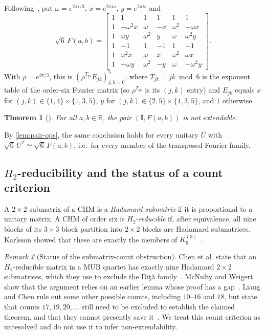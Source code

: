\documentclass[11pt]{article}
\numberwithin{equation}{section}
\theoremstyle{plain}
\newtheorem{theorem}{Theorem}[section]
\theoremstyle{definition}
\theoremstyle{remark}
\newtheorem{remark}[theorem]{Remark}
\newcommand{\I}{\mathbf{I}}
\newcommand{\Dita}{\texorpdfstring{Di\c{t}\u{a}}{Dita}}
\begin{document}
Following~\cite[Eq.~(3)]{Jaming2009}, put $\omega=e^{2\pi i/3}$, $x=e^{2\pi ia}$, $y=e^{2\pi ib}$ and
\begin{equation}\label{eq:jaming}
\sqrt6\,F(a,b)=
\begin{bmatrix}
1&1&1&1&1&1\\
1&-\omega^2x&\omega&-x&\omega^2&-\omega x\\
1&\omega y&\omega^2&y&\omega&\omega^2y\\
1&-1&1&-1&1&-1\\
1&\omega^2x&\omega&x&\omega^2&\omega x\\
1&-\omega y&\omega^2&-y&\omega&-\omega^2y
\end{bmatrix}.
\end{equation}
With $\rho=e^{i\pi/3}$, this is $(\rho^{T_{jk}}E_{jk})_{j,k=0}^5$, where $T_{jk}=jk\bmod 6$ is the exponent table of the order-six Fourier matrix (so $\rho^{T_{jk}}$ is its $(j,k)$ entry) and $E_{jk}$ equals $x$ for $(j,k)\in\{1,4\}\times\{1,3,5\}$, $y$ for $(j,k)\in\{2,5\}\times\{1,3,5\}$, and $1$ otherwise.

\begin{theorem}[{\cite[Thm.~1.4]{Jaming2009}}]\label{thm:jaming}
For all $a,b\in\mathbb R$, the pair $(\I,F(a,b))$ is not extendable.
\end{theorem}

By \cref{lem:pair-ops}, the same conclusion holds for every unitary $U$ with $\sqrt6\,U^{T}\simeq\sqrt6\,F(a,b)$, i.e.\ for every member of the transposed Fourier family.

\subsection{\texorpdfstring{$H_2$}{H2}-reducibility and the status of a count criterion}

A $2\times2$ submatrix of a CHM is a \emph{Hadamard submatrix} if it is proportional to a unitary matrix. A CHM of order six is \emph{$H_2$-reducible} if, after equivalence, all nine blocks of its $3\times3$ block partition into $2\times2$ blocks are Hadamard submatrices. Karlsson showed that these are exactly the members of $K_6^{(3)}$~\cite{KarlssonH2,Karlsson2011}.

\begin{remark}[Status of the submatrix-count obstruction]\label{rem:chen-status}
Chen et al. state that an $H_2$-reducible matrix in a MUB quartet has exactly nine Hadamard $2\times2$ submatrices, which they use to exclude the \Dita{} family~\cite{Chen2021}. McNulty and Weigert show that the argument relies on an earlier lemma whose proof has a gap~\cite{McNultyWeigert2025Comment}. Liang and Chen rule out some other possible counts, including $10$--$16$ and $18$, but state that counts $17,19,20,\ldots$ still need to be excluded to establish the claimed theorem, and that they cannot presently save it~\cite{LiangChen2025Reply}. We treat this count criterion as unresolved and do not use it to infer non-extendability.
\end{remark}
\end{document}

